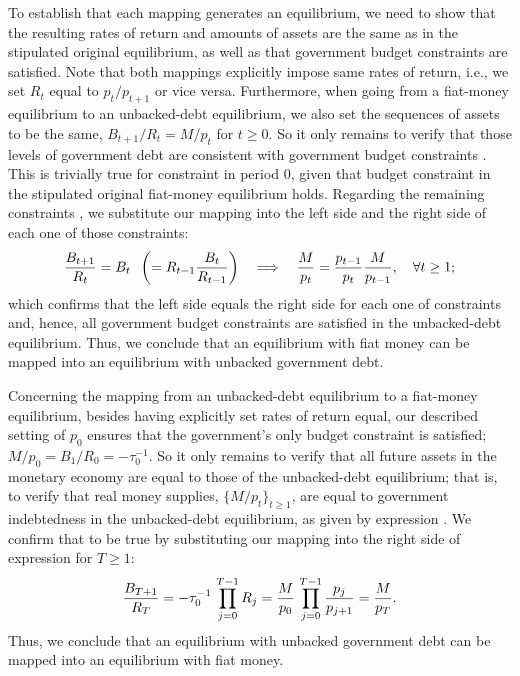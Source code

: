 To establish that each mapping generates an equilibrium, we need 
to show that the resulting rates of return and amounts of assets 
are the same as in the stipulated original equilibrium, as well 
as that government budget constraints are satisfied. Note that 
both mappings explicitly impose same rates of return, i.e., we
set $R_t$ equal to $p_t/p_{t+1}$ or vice versa. Furthermore, 
when going from a fiat-money equilibrium 
to an unbacked-debt equilibrium, we also set the sequences
of assets to be the same, $B_{t+1}/R_t=M/p_t$ for $t\geq 0$. So
it only remains to verify that those levels of government debt
are consistent with government budget constraints . 
This is trivially true for constraint  in 
period $0$, given that budget constraint  in the 
stipulated original fiat-money equilibrium holds. Regarding the 
remaining constraints , we substitute our 
mapping into the left side and the right side of each one of 
those constraints:
$${B_{t+1} \over R_t} = B_t \;\; 
\left(= R_{t-1} {B_t \over R_{t-1}} \right)
\quad \Longrightarrow \quad     
{M \over p_t} = {p_{t-1} \over p_t} {M \over p_{t-1}} ,
\quad \forall t \geq 1;
$$
which confirms that the left side equals the right side for
each one of constraints  and, hence, all 
government budget constraints are satisfied in the unbacked-debt
equilibrium. Thus, we conclude that an equilibrium with
fiat money can be mapped into an equilibrium with unbacked 
government debt. 

Concerning the mapping from an unbacked-debt 
equilibrium to a fiat-money equilibrium, besides having
explicitly set rates of return equal, our described 
setting of $p_0$ ensures that the government's only
budget constraint  is satisfied;
$M/p_0=B_1/R_0 = -\tau^{-1}_0$. So it only
remains to verify that all future assets in the
monetary economy are equal to those of the
unbacked-debt equilibrium; that is, to verify that
real money supplies, $\{M/p_t\}_{t\geq 1}$, are equal 
to government indebtedness in the unbacked-debt 
equilibrium, as given by expression . 
We confirm that to be true 
by substituting our mapping into the right side of 
expression  for $T \geq 1$:
$$ {B_{T+1} \over R_{T} } = -\tau^{-1}_0 \, \prod_{j=0}^{T-1} R_j 
= {M \over p_0} \, \prod_{j=0}^{T-1} {p_j \over p_{j+1} }
= {M \over p_T }.
$$
Thus, we conclude that an equilibrium with unbacked 
government debt can be mapped into an equilibrium
with fiat money. 

